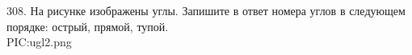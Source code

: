 308. На рисунке изображены углы. Запишите в ответ номера углов в следующем порядке: острый, прямой, тупой.\\
{{PIC:ugl2.png}}\newpage\noindent
